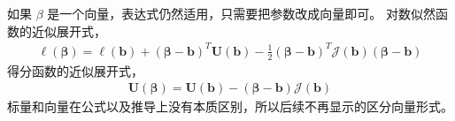 \documentclass[letterpaper,10pt,english]{sphinxmanual}
\begin{document}
如果 \(\beta\) 是一个向量，表达式仍然适用，只需要把参数改成向量即可。
对数似然函数的近似展开式，
\begin{equation}\label{equation:模型评估/influence:eq_influence_250}
\begin{split}\ell(\pmb{\beta}) = \ell(\mathbf{b}) + (\pmb{\beta}-\mathbf{b})^T \mathbf{U}(\mathbf{b})
- \frac{1}{2}(\pmb{\beta}-\mathbf{b})^T \pmb{\mathcal{J}}(\pmb{b})(\pmb{\beta}-\mathbf{b})\end{split}
\end{equation}
得分函数的近似展开式，
\begin{equation}\label{equation:模型评估/influence:eq_influence_251}
\begin{split}\mathbf{U}(\pmb{\beta}) = \mathbf{U}(\mathbf{b}) - (\pmb{\beta}-\mathbf{b}) \pmb{\mathcal{J}}(\mathbf{b})\end{split}
\end{equation}
标量和向量在公式以及推导上没有本质区别，所以后续不再显示的区分向量形式。
\end{document}
